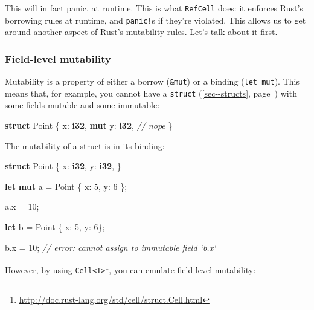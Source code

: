 \documentclass[a4paper,]{book}
\renewcommand*{\hyperref}[2][\ar]{%
  \def\ar{#2}%
  #2 (\autoref{#1}, page~\pageref{#1})}
\newenvironment{Shaded}{\begin{snugshade}}{\end{snugshade}}
\newcommand{\KeywordTok}[1]{\textcolor[rgb]{0.13,0.29,0.53}{\textbf{{#1}}}}
\newcommand{\DecValTok}[1]{\textcolor[rgb]{0.00,0.00,0.81}{{#1}}}
\newcommand{\CommentTok}[1]{\textcolor[rgb]{0.56,0.35,0.01}{\textit{{#1}}}}
\newcommand{\NormalTok}[1]{{#1}}
\renewcommand{\href}[2]{#2\footnote{\url{#1}}}
\begin{document}
This will in fact panic, at runtime. This is what \texttt{RefCell} does:
it enforces Rust's borrowing rules at runtime, and \texttt{panic!}s if
they're violated. This allows us to get around another aspect of Rust's
mutability rules. Let's talk about it first.

\subsubsection{Field-level mutability}\label{field-level-mutability}

Mutability is a property of either a borrow (\texttt{\&mut}) or a
binding (\texttt{let\ mut}). This means that, for example, you cannot
have a \hyperref[sec--structs]{\texttt{struct}} with some fields mutable
and some immutable:

\begin{Shaded}
\begin{Highlighting}[]
\KeywordTok{struct} \NormalTok{Point \{}
    \NormalTok{x: }\KeywordTok{i32}\NormalTok{,}
    \KeywordTok{mut} \NormalTok{y: }\KeywordTok{i32}\NormalTok{, }\CommentTok{// nope}
\NormalTok{\}}
\end{Highlighting}
\end{Shaded}

The mutability of a struct is in its binding:

\begin{Shaded}
\begin{Highlighting}[]
\KeywordTok{struct} \NormalTok{Point \{}
    \NormalTok{x: }\KeywordTok{i32}\NormalTok{,}
    \NormalTok{y: }\KeywordTok{i32}\NormalTok{,}
\NormalTok{\}}

\KeywordTok{let} \KeywordTok{mut} \NormalTok{a = Point \{ x: }\DecValTok{5}\NormalTok{, y: }\DecValTok{6} \NormalTok{\};}

\NormalTok{a.x = }\DecValTok{10}\NormalTok{;}

\KeywordTok{let} \NormalTok{b = Point \{ x: }\DecValTok{5}\NormalTok{, y: }\DecValTok{6}\NormalTok{\};}

\NormalTok{b.x = }\DecValTok{10}\NormalTok{; }\CommentTok{// error: cannot assign to immutable field `b.x`}
\end{Highlighting}
\end{Shaded}

However, by using
\href{http://doc.rust-lang.org/std/cell/struct.Cell.html}{\texttt{Cell\textless{}T\textgreater{}}},
you can emulate field-level mutability:
\end{document}
